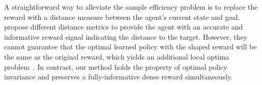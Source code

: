 \documentclass[journal]{IEEEtran}
\begin{document}
A straightforward way to alleviate the sample efficiency problem is to replace the reward with a distance measure between the agent's current state and goal.
\citep{wu2018laplacian, ghosh2018learning, warde2018unsupervised, hartikainen2019dynamical, durugkar2021adversarial} propose different distance metrics to provide the agent with an accurate and informative reward signal indicating the distance to the target. 
However, they cannot guarantee that the optimal learned policy with the shaped reward will be the same as the original reward, which yields an additional local optima problem~\citep{trott2019keeping}.
In contrast, our method holds the property of optimal policy invariance and preserves a fully-informative dense reward simultaneously.
\end{document}

